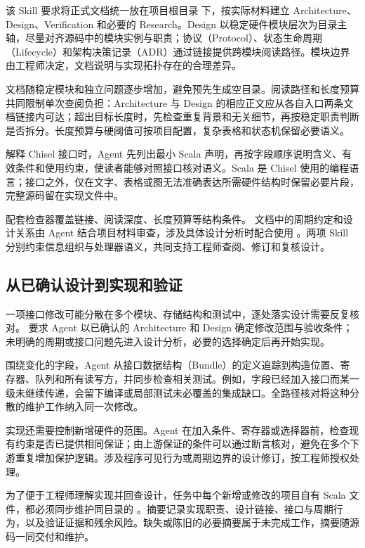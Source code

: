 \documentclass[UTF8,fontset=none,zihao=-4,a4paper]{ctexart}
\begin{document}
该 Skill 要求将正式文档统一放在项目根目录  下，按实际材料建立 Architecture、Design、Verification 和必要的 Research。Design 以稳定硬件模块层次为目录主轴，尽量对齐源码中的模块实例与职责；协议（Protocol）、状态生命周期（Lifecycle）和架构决策记录（ADR）通过链接提供跨模块阅读路径。模块边界由工程师决定，文档说明与实现拓扑存在的合理差异。

文档随稳定模块和独立问题逐步增加，避免预先生成空目录。阅读路径和长度预算共同限制单次查阅负担：Architecture 与 Design 的相应正文应从各自入口两条文档链接内可达；超出目标长度时，先检查重复背景和无关细节，再按稳定职责判断是否拆分。长度预算与硬阈值可按项目配置，复杂表格和状态机保留必要语义。

解释 Chisel 接口时，Agent 先列出最小 Scala 声明，再按字段顺序说明含义、有效条件和使用约束，使读者能够对照接口核对语义。Scala 是 Chisel 使用的编程语言；接口之外，仅在文字、表格或图无法准确表达所需硬件结构时保留必要片段，完整源码留在实现文件中。

配套检查器覆盖链接、阅读深度、长度预算等结构条件。 文档中的周期约定和设计关系由 Agent 结合项目材料审查，涉及具体设计分析时配合使用 。两项 Skill 分别约束信息组织与处理器语义，共同支持工程师查阅、修订和复核设计。

\subsection{从已确认设计到实现和验证}

一项接口修改可能分散在多个模块、存储结构和测试中，逐处落实设计需要反复核对。 要求 Agent 以已确认的 Architecture 和 Design 确定修改范围与验收条件；未明确的周期或接口问题先进入设计分析，必要的选择确定后再开始实现。

围绕变化的字段，Agent 从接口数据结构（Bundle）的定义追踪到构造位置、寄存器、队列和所有读写方，并同步检查相关测试。例如，字段已经加入接口而某一级未继续传递，会留下编译或局部测试未必覆盖的集成缺口。全路径核对将这种分散的维护工作纳入同一次修改。

实现还需要控制新增硬件的范围。Agent 在加入条件、寄存器或选择器前，检查现有约束是否已提供相同保证；由上游保证的条件可以通过断言核对，避免在多个下游重复增加保护逻辑。涉及程序可见行为或周期边界的设计修订，按工程师授权处理。

为了便于工程师理解实现并回查设计，任务中每个新增或修改的项目自有 Scala 文件，都必须同步维护同目录的 。摘要记录实现职责、设计链接、接口与周期行为，以及验证证据和残余风险。缺失或陈旧的必要摘要属于未完成工作，摘要随源码一同交付和维护。
\end{document}
